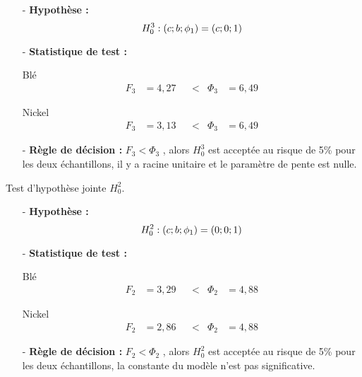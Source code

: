     \begin{itemize}
    \item[-]\textbf{Hypothèse :} 
    \begin{equation*}
        H_{0}^{3} : (c; b; \phi_{1}) = (c;0;1)\\
    \end{equation*}
    \item[-]\textbf{Statistique de test :} 
    \begin{multicols}{2}
        \centering Blé
        \begin{align*}
            F_{3} &= 4,27  & &< & \Phi_{3} &= 6,49
        \end{align*}
    
        \columnbreak
    
        \centering Nickel
        \begin{align*}
            F_{3} &= 3,13 & &< & \Phi_{3} &= 6,49
        \end{align*}
    \end{multicols}
    \item[-]\textbf{Règle de décision :} $F_{3} < \Phi_{3}$ , alors $H_{0}^{3}$ est acceptée au risque de 5\% pour les deux échantillons, il y a racine unitaire et le 
    paramètre de pente est nulle.
    \end{itemize}
    Test d'hypothèse jointe $H_{0}^{2}$.
    \begin{itemize}
    \item[-]\textbf{Hypothèse :} 
    \begin{equation*}
        H_{0}^{2} : (c; b; \phi_{1}) = (0;0;1)\\
    \end{equation*}
    \item[-]\textbf{Statistique de test :}
    \begin{multicols}{2}
        \centering Blé
        \begin{align*}
            F_{2} &= 3,29  & &< & \Phi_{2} &= 4,88
        \end{align*}
    
        \columnbreak
    
        \centering Nickel
        \begin{align*}
            F_{2} &= 2,86 & &< & \Phi_{2} &= 4,88
        \end{align*}
    \end{multicols}  
    \item[-]\textbf{Règle de décision :} $F_{2} < \Phi_{2}$ , alors $H_{0}^{2}$ est acceptée au risque de 5\% pour les deux échantillons, la constante du modèle n'est pas
    significative.
    \end{itemize}
